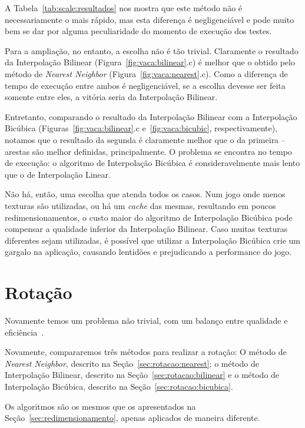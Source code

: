 \documentclass[12pt]{article}
\begin{document}
A Tabela~\ref{tab:scale:resultados} nos mostra que este método não é necessariamente o mais rápido, mas esta diferen\c{c}a é negligenciável e pode muito bem se dar por alguma peculiaridade do momento de execução dos testes.

Para a ampliação, no entanto, a escolha não é tão trivial. Claramente o resultado da Interpolação Bilinear (Figura~\ref{fig:vaca:bilinear}.c) é melhor que o obtido pelo método de \textit{Nearest Neighbor} (Figura~\ref{fig:vaca:nearest}.c). Como a diferen\c{c}a de tempo de execução entre ambos é negligenciável, se a escolha devesse ser feita somente entre eles, a vitória seria da Interpolação Bilinear.

Entretanto, comparando o resultado da Interpolação Bilinear com a Interpolação Bicúbica (Figuras~\ref{fig:vaca:bilinear}.c e~\ref{fig:vaca:bicubic}, respectivamente), notamos que o resultado da segunda é claramente melhor que o da primeira -- arestas são melhor definidas, principalmente. O problema se encontra no tempo de execução: o algoritmo de Interpolação Bicúbica é consideravelmente mais lento que o de Interpolação Linear.

Não há, então, uma escolha que atenda todos os casos. Num jogo onde menos texturas são utilizadas, ou há um \emph{cache} das mesmas, resultando em poucos redimensionamentos, o custo maior do algoritmo de Interpolação Bicúbica pode compensar a qualidade inferior da Interpolação Bilinear. Caso muitas texturas diferentes sejam utilizadas, é possível que utilizar a Interpolação Bicúbica crie um gargalo na aplica\c{c}ão, causando lentidões e prejudicando a performance do jogo.

\section{Rotação}\label{sec:rotacao}

Novamente temos um problema não trivial, com um balanço entre qualidade e eficiência~\cite{kopf:2011}.

Novamente, compararemos três métodos para realizar a rotação: O método de \textit{Nearest Neighbor}, descrito na Seção~\ref{sec:rotacao:nearest}; o método de Interpolação Bilinear, descrito na Seção~\ref{sec:rotacao:bilinear} e o método de Interpolação Bicúbica, descrito na Seção~\ref{sec:rotacao:bicubica}.

Os algoritmos são os mesmos que os apresentados na Seção~\ref{sec:redimensionamento}, apenas aplicados de maneira diferente.
\end{document}
